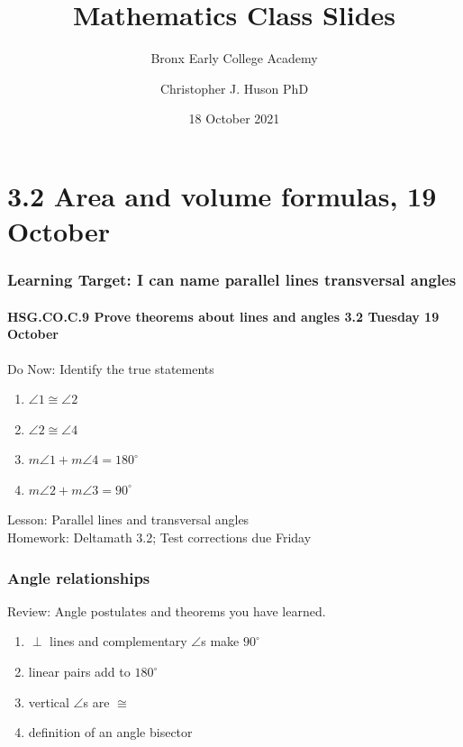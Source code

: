 \documentclass{beamer}
\title{Mathematics Class Slides}
\subtitle{Bronx Early College Academy}
\author{Christopher J. Huson PhD}
\date{18 October 2021}
\begin{document}
\frame{\titlepage}
\section[Outline]{}
\frame{\tableofcontents}

\section{3.2 Area and volume formulas, 19 October}
\frame
{
  \frametitle{Learning Target: I can name parallel lines transversal angles}
  \framesubtitle{HSG.CO.C.9 Prove theorems about lines and angles  \hfill \alert{3.2 Tuesday 19 October}}
  \begin{block}{Do Now: Identify the true statements}
    \begin{multicols}{2}
    \begin{enumerate}
      \item $\angle 1 \cong \angle 2$
      \item $\angle 2 \cong \angle 4$
      \item $m\angle 1 + m\angle 4=180^\circ$
      \item $m\angle 2 + m\angle 3=90^\circ$
  \end{enumerate}
  \begin{center}
  \end{center}
\end{multicols}
\end{block}
  Lesson: Parallel lines and transversal angles \\[0.25cm]
  Homework: Deltamath 3.2; Test corrections due Friday
}

\frame
  {
    \frametitle{Angle relationships}
    Review: Angle postulates and theorems you have learned. 
    \begin{enumerate}
      \item $\perp$ lines and complementary $\angle$s make $90^\circ$
      \item linear pairs add to $180^\circ$
      \item vertical $\angle$s are $\cong$
      \item definition of an angle bisector
    \end{enumerate}
  }
\end{document}
